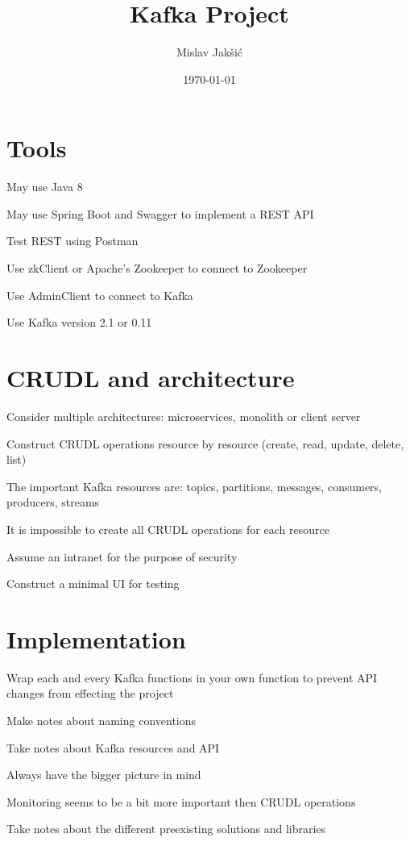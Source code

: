 \documentclass{article}
\title{Kafka Project}
\author{Mislav Jakšić}
\date{\today{}}
\begin{document}
\maketitle

\section{Tools}

May use Java 8

May use Spring Boot and Swagger to implement a REST API

Test REST using Postman

Use zkClient or Apache's Zookeeper to connect to Zookeeper

Use AdminClient to connect to Kafka

Use Kafka version 2.1 or 0.11

\section{CRUDL and architecture}

Consider multiple architectures: microservices, monolith or client server

Construct CRUDL operations resource by resource (create, read, update, delete, list)

The important Kafka resources are: topics, partitions, messages, consumers, producers, streams

It is impossible to create all CRUDL operations for each resource

Assume an intranet for the purpose of security

Construct a minimal UI for testing

\section{Implementation}

Wrap each and every Kafka functions in your own function to prevent API changes from effecting the project

Make notes about naming conventions

Take notes about Kafka resources and API

Always have the bigger picture in mind

Monitoring seems to be a bit more important then CRUDL operations

Take notes about the different preexisting solutions and libraries
\end{document}
